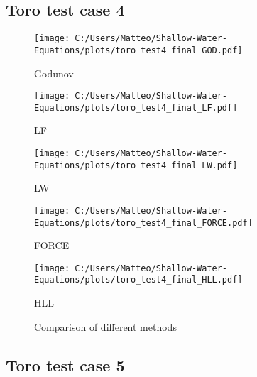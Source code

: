 \subsection{Toro test case 4}
\begin{figure}[H]
    \centering
    \begin{minipage}{0.45\textwidth}
        \centering
        \texttt{[image: C:/Users/Matteo/Shallow-Water-Equations/plots/toro\_test4\_final\_GOD.pdf]}
        \caption{Godunov}
    \end{minipage}%
    \hfill
    \begin{minipage}{0.45\textwidth}
        \centering
        \texttt{[image: C:/Users/Matteo/Shallow-Water-Equations/plots/toro\_test4\_final\_LF.pdf]}
        \caption{LF}
    \end{minipage}
    
    \vspace{0.5cm} %
    
    \begin{minipage}{0.45\textwidth}
        \centering
        \texttt{[image: C:/Users/Matteo/Shallow-Water-Equations/plots/toro\_test4\_final\_LW.pdf]}
        \caption{LW}
    \end{minipage}%
    \hfill
    \begin{minipage}{0.45\textwidth}
        \centering
        \texttt{[image: C:/Users/Matteo/Shallow-Water-Equations/plots/toro\_test4\_final\_FORCE.pdf]}
        \caption{FORCE}
    \end{minipage}

    \vspace{0.5cm} %
    
    \begin{minipage}{0.45\textwidth}
        \centering
        \texttt{[image: C:/Users/Matteo/Shallow-Water-Equations/plots/toro\_test4\_final\_HLL.pdf]}
        \caption{HLL}
    \end{minipage}
    \caption{Comparison of different methods}
\end{figure}



\subsection{Toro test case 5}

